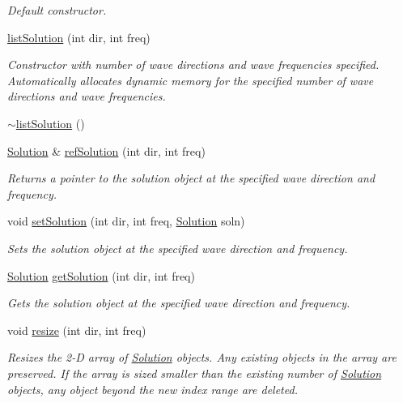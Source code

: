 \begin{DoxyCompactItemize}
\begin{DoxyCompactList}\small\item\em Default constructor. \end{DoxyCompactList}\item 
\hyperlink{classlist_solution_ab7a21a46816be43db63f6d6d1773366b}{list\-Solution} (int dir, int freq)
\begin{DoxyCompactList}\small\item\em Constructor with number of wave directions and wave frequencies specified. Automatically allocates dynamic memory for the specified number of wave directions and wave frequencies. \end{DoxyCompactList}\item 
\hyperlink{classlist_solution_a02b5f6df04333f91a4bf9a297b145826}{$\sim$list\-Solution} ()
\item 
\hyperlink{class_solution}{Solution} \& \hyperlink{classlist_solution_aae2dcc67016955affa22dc752c583c59}{ref\-Solution} (int dir, int freq)
\begin{DoxyCompactList}\small\item\em Returns a pointer to the solution object at the specified wave direction and frequency. \end{DoxyCompactList}\item 
void \hyperlink{classlist_solution_a5f833204f4836e3e2475d748e4b6690c}{set\-Solution} (int dir, int freq, \hyperlink{class_solution}{Solution} soln)
\begin{DoxyCompactList}\small\item\em Sets the solution object at the specified wave direction and frequency. \end{DoxyCompactList}\item 
\hyperlink{class_solution}{Solution} \hyperlink{classlist_solution_ac3c2f8b35907a1563bc3f7ca0157ba25}{get\-Solution} (int dir, int freq)
\begin{DoxyCompactList}\small\item\em Gets the solution object at the specified wave direction and frequency. \end{DoxyCompactList}\item 
void \hyperlink{classlist_solution_a0127a6f326ca08b2c965592dda51dc1e}{resize} (int dir, int freq)
\begin{DoxyCompactList}\small\item\em Resizes the 2-\/\-D array of \hyperlink{class_solution}{Solution} objects. Any existing objects in the array are preserved. If the array is sized smaller than the existing number of \hyperlink{class_solution}{Solution} objects, any object beyond the new index range are deleted. \end{DoxyCompactList}\item 

\end{DoxyCompactItemize}
